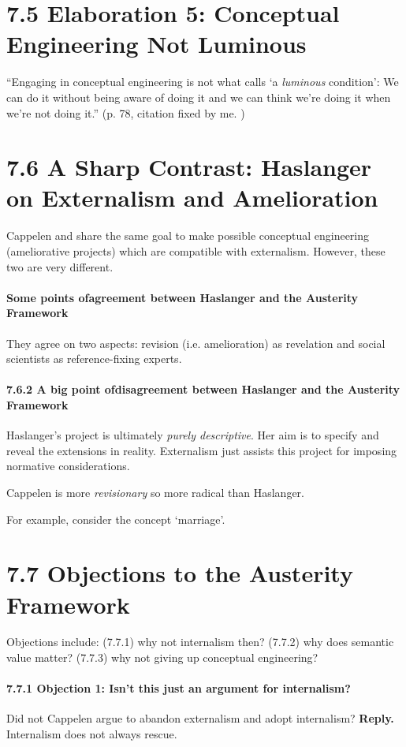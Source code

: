 \documentclass[
10pt, %
a4paper, %
twocolumn, %
landscape %
]{article}
\begin{document}
\section*{7.5 Elaboration 5: Conceptual Engineering Not Luminous}
``Engaging in conceptual engineering is not what  \cite{Williamson2002_knowledge} calls `a \emph{luminous} condition': We can do it without being aware of doing it and we can think we’re doing it when we're not doing it.''
(p. 78, citation fixed by me. )



\section*{7.6 A Sharp Contrast: Haslanger on Externalism and Amelioration}
Cappelen and \cite{Haslanger2012} share the same goal to make possible conceptual engineering (ameliorative projects) which are compatible with externalism. However, these two are very different.

\paragraph{Some points ofagreement between Haslanger and the Austerity Framework}
They agree on two aspects: revision (i.e. amelioration) as revelation and social scientists as reference-fixing experts.

\paragraph{7.6.2 A big point ofdisagreement between Haslanger and the Austerity Framework}
Haslanger's project is ultimately \emph{purely descriptive}. Her aim is to specify and reveal the extensions in reality. Externalism just assists this project for imposing normative considerations.

Cappelen is more \emph{revisionary} so more radical than Haslanger.

For example, consider the concept `marriage'.

\section*{7.7 Objections to the Austerity Framework}
 Objections include: (7.7.1) why not internalism then? (7.7.2) why does semantic value matter? (7.7.3) why not giving up conceptual engineering?

\paragraph{7.7.1 Objection 1: Isn't this just an argument for internalism?}
Did not Cappelen argue to abandon externalism and adopt internalism?
\noindent \textbf{Reply.}
Internalism does not always rescue.
\end{document}

